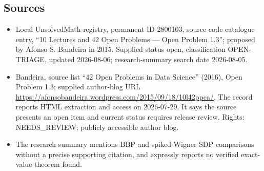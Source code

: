 \documentclass[11pt]{article}
\begin{document}
\subsection{Sources}
\begin{itemize}
\item Local UnsolvedMath registry, permanent ID 2800103, source code catalogue entry, ``10 Lectures and 42 Open Problems --- Open Problem 1.3''; proposed by Afonso S. Bandeira in 2015. Supplied status open, classification OPEN-TRIAGE, updated 2026-08-06; research-summary search date 2026-08-05.
\item Bandeira, source list ``42 Open Problems in Data Science'' (2016), Open Problem 1.3; supplied author-blog URL \url{https://afonsobandeira.wordpress.com/2015/09/18/10l42ppca/}. The record reports HTML extraction and access on 2026-07-29. It says the source presents an open item and current status requires release review. Rights: NEEDS\_REVIEW; publicly accessible author blog.
\item The research summary mentions BBP and spiked-Wigner SDP comparisons without a precise supporting citation, and expressly reports no verified exact-value theorem found.
\end{itemize}
\end{document}
